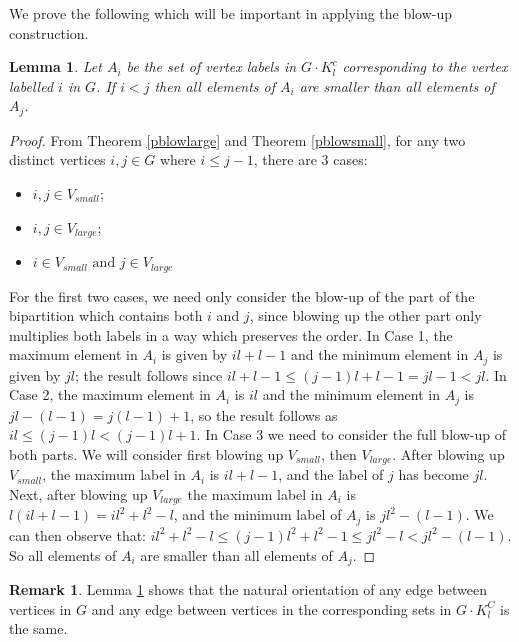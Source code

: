 \documentclass[12pt, a4paper]{article}
\newtheorem{lemma}[theorem]{Lemma}
\theoremstyle{definition}
\newtheorem{remark}[theorem]{Remark}
\begin{document}
We prove the following which will be important in applying the blow-up construction.

\begin{lemma}\label{blowdirec}
Let $A_i$ be the set of vertex labels in $G \cdot K^c_l$ corresponding to the vertex labelled $i$ in $G$. If $i<j$ then all elements of $A_i$ are smaller than all elements of $A_j$.
\end{lemma}
\begin{proof}
From Theorem \ref{pblowlarge} and Theorem \ref{pblowsmall}, for any two distinct vertices $i, j \in G$ where $i \leq  j-1$, there are 3 cases:
\begin{itemize}
\item[(1)] $i,j \in V_{small}$;
\item[(2)] $i,j \in V_{large}$;
\item[(3)] $i \in V_{small} \text{ and } j \in V_{large}$
\end{itemize}
For the first two cases, we need only consider the blow-up of the part of the bipartition which contains both $i$ and $j$, since blowing up the other part only multiplies both labels in a way which preserves the order.  In Case 1, the maximum element in $A_i$ is given by $il+l-1$ and the minimum element in $A_j$ is given by $jl$; the result follows since $il+l-1 \leq (j-1)l+l-1 = jl-1 < jl$.  In Case 2, the maximum element in $A_i$ is $il$ and the minimum element in $A_j$ is $jl-(l-1)=j(l-1)+1$, so the result follows as $il \leq (j-1)l < (j-1)l+1$.  In Case 3 we need to consider the full blow-up of both parts.  We will consider first blowing up $V_{small}$, then $V_{large}$. After blowing up $V_{small}$, the maximum label in $A_i$ is $il+l-1$, and the label of $j$ has become $jl$.  Next, after blowing up $V_{large}$ the maximum label in $A_i$ is $l(il+l-1)=il^2+l^2-l$, and the minimum label of $A_j$ is $jl^2-(l-1)$.  We can then observe that: $il^2+l^2-l \leq (j-1)l^2+l^2-1 \leq jl^2-l < jl^2 -(l-1)$.  So all elements of $A_i$ are smaller than all elements of $A_j.$
\end{proof}

\begin{remark}\label{cordir}
Lemma \ref{blowdirec} shows that the natural orientation of any edge between vertices in $G$ and any edge between vertices in the corresponding sets in $G \cdot K_{l}^C$ is the same. 
\end{remark}
\end{document}
